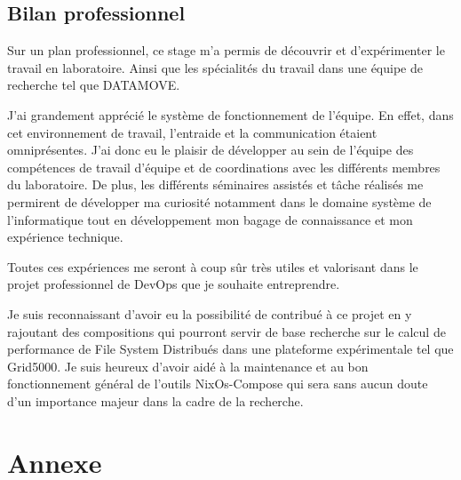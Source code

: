 \documentclass[a4paper,french,12pt, titlepage]{article}
\begin{document}
\hypertarget{bilan-professionnel}{%
\subsection{Bilan professionnel}\label{bilan-professionnel}}

Sur un plan professionnel, ce stage m'a permis de découvrir et
d'expérimenter le travail en laboratoire. Ainsi que les spécialités du
travail dans une équipe de recherche tel que DATAMOVE.

J'ai grandement apprécié le système de fonctionnement de l'équipe. En
effet, dans cet environnement de travail, l'entraide et la communication
étaient omniprésentes. J'ai donc eu le plaisir de développer au sein de
l'équipe des compétences de travail d'équipe et de coordinations avec
les différents membres du laboratoire. De plus, les différents
séminaires assistés et tâche réalisés me permirent de développer ma
curiosité notamment dans le domaine système de l'informatique tout en
développement mon bagage de connaissance et mon expérience technique.

Toutes ces expériences me seront à coup sûr très utiles et valorisant
dans le projet professionnel de DevOps que je souhaite entreprendre.

Je suis reconnaissant d'avoir eu la possibilité de contribué à ce projet
en y rajoutant des compositions qui pourront servir de base recherche
sur le calcul de performance de File System Distribués dans une
plateforme expérimentale tel que Grid5000. Je suis heureux d'avoir aidé
à la maintenance et au bon fonctionnement général de l'outils
NixOs-Compose qui sera sans aucun doute d'un importance majeur dans la
cadre de la recherche.\newline

\newpage

\hypertarget{annexe}{%
\section{Annexe}\label{annexe}}

\printbibliography

\printglossaries

\newpage
\end{document}
